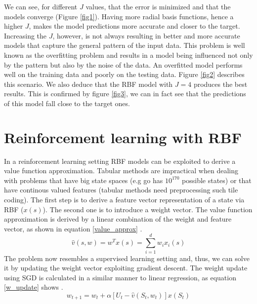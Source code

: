 \documentclass[runningheads]{llncs}
\begin{document}
We can see, for different $J$ values, that the error is
minimized and that the models converge (Figure \ref{fig1}). Having
more radial basis functions, hence a higher $J$, makes the model
predictions more accurate and closer to the target. Increasing the
$J$, however, is not always resulting in better and more accurate
models that capture the general pattern of the input data. This
problem is well known as the overfitting problem and results in a
model being influenced not only by the pattern but also by the noise
of the data. An overfitted model performs well on the training data
and poorly on the testing data. Figure \ref{fig2} describes this
scenario. We also deduce that the RBF model with $J = 4$
produces the best results. This is confirmed by figure \ref{fig3}, we
can in fact see that the predictions of this model fall close to the
target ones.

\section{Reinforcement learning with RBF}
In a reinforcement learning setting RBF models can be exploited to
derive a value function approximation. Tabular methods are impractical
when dealing with problems that have big state spaces (e.g go has
$10^{170}$ possible states) or that have continous valued features
(tabular methods need preprocessing such tile coding). The first step
is to derive a feature vector representation of a state via RBF ($x(s)$). The
second one is to introduce a weight vector. The value function
approximation is derived by a linear combination of the weight and
feature vector, as shown in equation \ref{value_approx} \cite{rlbook}.
\begin{equation}\label{value_approx}
\hat{v}(s, w) = w^Tx(s) = \sum_{i=1}^{d}w_ix_i(s)  
\end{equation}
The problem now resembles a supervised learning setting and, thus, we
can solve it by updating the weight vector exploiting gradient
descent. The weight update using SGD is calculated in a similar
manner to linear regression, as equation \ref{w_update} shows
\cite{rlbook}.
\begin{equation}\label{w_update}
w_{t+1} = w_t + \alpha\left[U_t - \hat{v}(S_t, w_t)\right]x(S_t)
\end{equation}
\end{document}
